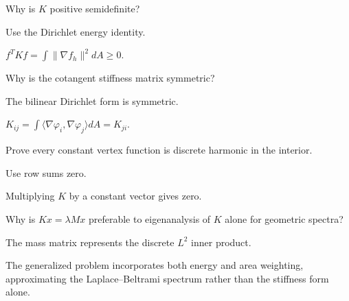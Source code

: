 \begin{exercise}\label{exr:vii41-ped-06}
Why is \(K\) positive semidefinite?
\end{exercise}

\begin{hint}
Use the Dirichlet energy identity.
\end{hint}

\begin{solution}
\(f^TKf=\int\|\nabla f_h\|^2dA\ge0\).
\end{solution}

\begin{exercise}[Symmetry]\label{exr:vii41-ped-07}
Why is the cotangent stiffness matrix symmetric?
\end{exercise}

\begin{hint}
The bilinear Dirichlet form is symmetric.
\end{hint}

\begin{solution}
\(K_{ij}=\int\langle\nabla\varphi_i,\nabla\varphi_j\rangle dA=K_{ji}\).
\end{solution}

\begin{exercise}\label{exr:vii41-ped-08}
Prove every constant vertex function is discrete harmonic in the interior.
\end{exercise}

\begin{hint}
Use row sums zero.
\end{hint}

\begin{solution}
Multiplying \(K\) by a constant vector gives zero.
\end{solution}

\begin{exercise}\label{exr:vii41-ped-09}
Why is \(Kx=\lambda Mx\) preferable to eigenanalysis of \(K\) alone for geometric spectra?
\end{exercise}

\begin{hint}
The mass matrix represents the discrete \(L^2\) inner product.
\end{hint}

\begin{solution}
The generalized problem incorporates both energy and area weighting, approximating the Laplace--Beltrami spectrum rather than the stiffness form alone.
\end{solution}

